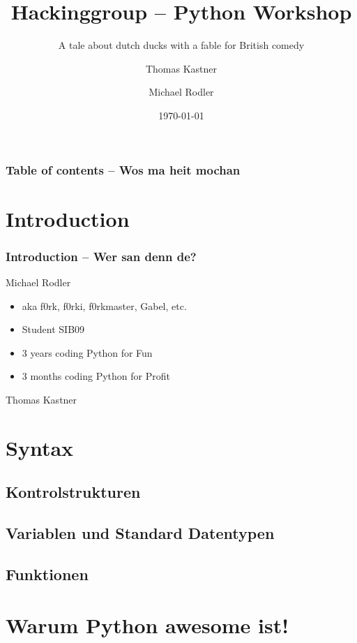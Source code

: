 \documentclass{beamer}
\title[Python Workshop]{Hackinggroup -- Python Workshop}
\subtitle{A tale about dutch ducks with a fable for British comedy}
\author[Thomas Kastner, Michael Rodler]{Thomas Kastner\and Michael Rodler}
\date{\today}
\begin{document}
\begin{frame}
\titlepage
\end{frame}

\begin{frame}
\frametitle{Table of contents -- Wos ma heit mochan}
\tableofcontents
\end{frame}

\section{Introduction}

\begin{frame}
\frametitle{Introduction -- Wer san denn de?}

\begin{block}{Michael Rodler}
\begin{itemize}
\item aka f0rk, f0rki, f0rkmaster, Gabel, etc.
\item Student SIB09
\item 3 years coding Python for Fun
\item 3 months coding Python for Profit
\end{itemize}
\end{block}

\begin{block}{Thomas Kastner}

\end{block}

\end{frame}


\section{Syntax}
\subsection{Kontrolstrukturen}
\subsection{Variablen und Standard Datentypen}
\subsection{Funktionen}

\section{Warum Python awesome ist!}
\end{document}
